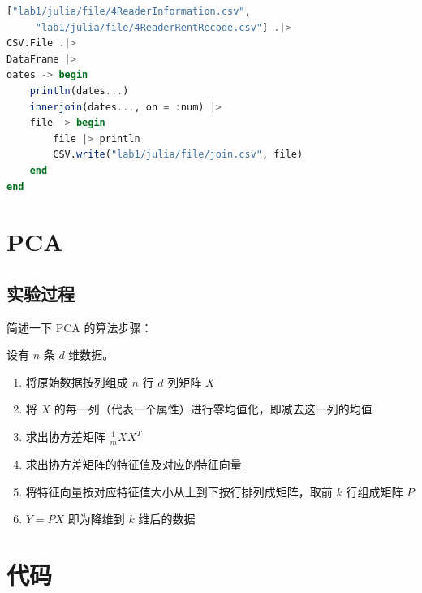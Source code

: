 \documentclass[a4paper]{article}
\begin{document}
\begin{lstlisting}[language=julia]
["lab1/julia/file/4ReaderInformation.csv",
     "lab1/julia/file/4ReaderRentRecode.csv"] .|>
CSV.File .|>
DataFrame |>
dates -> begin
    println(dates...)
    innerjoin(dates..., on = :num) |>
    file -> begin
        file |> println
        CSV.write("lab1/julia/file/join.csv", file)
    end
end
\end{lstlisting}

\newpage

\section{PCA}\label{sub:PCA}
\subsection{实验过程} \label{sub:PCA-lab}

简述一下 PCA 的算法步骤：

设有 $n$ 条 $d$ 维数据。
\begin{enumerate}
    \item 将原始数据按列组成 $n$ 行 $d$ 列矩阵 $X$
    \item 将 $X$ 的每一列（代表一个属性）进行零均值化，即减去这一列的均值
    \item 求出协方差矩阵 $\frac{1}{m}XX^T$
    \item 求出协方差矩阵的特征值及对应的特征向量
    \item 将特征向量按对应特征值大小从上到下按行排列成矩阵，取前 $k$ 行组成矩阵 $P$
    \item $Y=PX$ 即为降维到 $k$ 维后的数据
\end{enumerate}

\newpage

\appendix
\section{代码}
\end{document}
